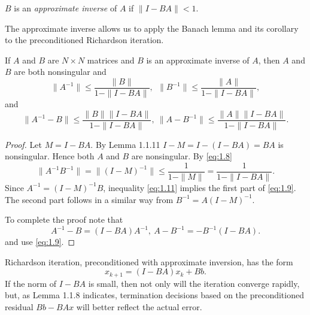 \begin{defi}
  $B$ is an \emph{approximate inverse} of $A$ if $\|I-BA\|<1$.
\end{defi}

\begin{rmk}
  The approximate inverse allows us to apply the Banach lemma and its
  corollary to the preconditioned Richardson iteration.
\end{rmk}

\begin{thm}
  If $A$ and $B$ are $N\times N$ matrices and $B$ is an approximate
  inverse of $A$, then $A$ and $B$ are both nonsingular and
  \begin{equation}
    \label{eq:1.9}
    \|A^{-1}\|\leq\frac{\|B\|}{1-\|I-BA\|},\ \  \|B^{-1}\|\leq\frac{\|A\|}{1-\|I-BA\|},
  \end{equation}
  and
  \begin{equation}
    \label{eq:1.10}
    \|A^{-1}-B\|\leq\frac{\|B\|\|I-BA\|}{1-\|I-BA\|},\ 
    \|A-B^{-1}\|\leq\frac{\|A\|\|I-BA\|}{1-\|I-BA\|}.
  \end{equation}
\end{thm}

\begin{proof}
  Let $M=I-BA$. By Lemma 1.1.11 $I-M=I-(I-BA)=BA$ is nonsingular. Hence
  both $A$ and $B$ are nonsingular. By \eqref{eq:1.8}
  \begin{equation}
    \label{eq:1.11}
    \|A^{-1}B^{-1}\|=\|(I-M)^{-1}\|\leq\frac{1}{1-\|M\|}=\frac{1}{1-\|I-BA\|}.
  \end{equation}
  Since $A^{-1}=(I-M)^{-1}B$, inequality \eqref{eq:1.11} implies the
  first part of \eqref{eq:1.9}. The second part follows in a similar
  way from $B^{-1}=A(I-M)^{-1}$.

  To complete the proof note that
  $$A^{-1}-B=(I-BA)A^{-1},\ A-B^{-1}=-B^{-1}(I-BA).$$
  and use \eqref{eq:1.9}.
\end{proof}

\begin{rmk}
  Richardson iteration, preconditioned with approximate inversion, has
  the form
  \begin{equation}
    \label{eq:1.12}
    x_{k+1}=(I-BA)x_k +Bb.
  \end{equation}
  If the norm of $I-BA$ is small, then not only will the iteration
  converge rapidly, but, as Lemma 1.1.8 indicates, termination
  decisions based on the preconditioned residual $Bb-BAx$ will better
  reflect the actual error.
\end{rmk}

